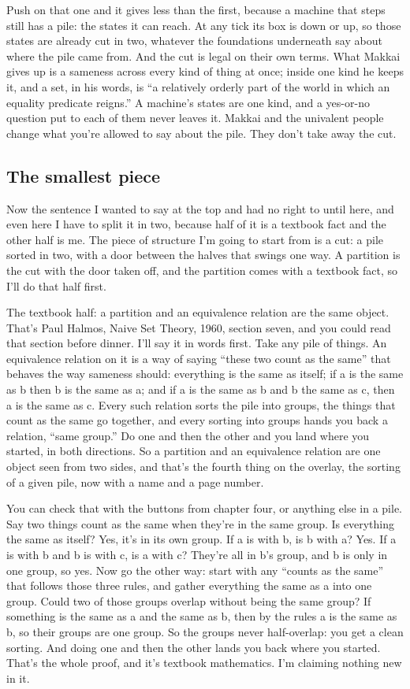 \documentclass[11pt,twoside]{article}
\theoremstyle{thielethm}
\theoremstyle{thieledef}
\theoremstyle{thieledef}
\theoremstyle{thieledef}
\theoremstyle{thielethm}
\theoremstyle{thieleobs}
\theoremstyle{thielethm}
\begin{document}
Push on that one and it gives less than the first, because a machine that steps still has a pile: the states it can reach. At any tick its box is down or up, so those states are already cut in two, whatever the foundations underneath say about where the pile came from. And the cut is legal on their own terms. What Makkai gives up is a sameness across every kind of thing at once; inside one kind he keeps it, and a set, in his words, is ``a relatively orderly part of the world in which an equality predicate reigns.'' A machine's states are one kind, and a yes-or-no question put to each of them never leaves it. Makkai and the univalent people change what you're allowed to say about the pile. They don't take away the cut.

\subsection{The smallest piece}

Now the sentence I wanted to say at the top and had no right to until here, and even here I have to split it in two, because half of it is a textbook fact and the other half is me. The piece of structure I'm going to start from is a cut: a pile sorted in two, with a door between the halves that swings one way. A partition is the cut with the door taken off, and the partition comes with a textbook fact, so I'll do that half first.

The textbook half: a partition and an equivalence relation are the same object. That's Paul Halmos, Naive Set Theory, 1960, section seven, and you could read that section before dinner. I'll say it in words first. Take any pile of things. An equivalence relation on it is a way of saying ``these two count as the same'' that behaves the way sameness should: everything is the same as itself; if a is the same as b then b is the same as a; and if a is the same as b and b the same as c, then a is the same as c. Every such relation sorts the pile into groups, the things that count as the same go together, and every sorting into groups hands you back a relation, ``same group.'' Do one and then the other and you land where you started, in both directions. So a partition and an equivalence relation are one object seen from two sides, and that's the fourth thing on the overlay, the sorting of a given pile, now with a name and a page number.

You can check that with the buttons from chapter four, or anything else in a pile. Say two things count as the same when they're in the same group. Is everything the same as itself? Yes, it's in its own group. If a is with b, is b with a? Yes. If a is with b and b is with c, is a with c? They're all in b's group, and b is only in one group, so yes. Now go the other way: start with any ``counts as the same'' that follows those three rules, and gather everything the same as a into one group. Could two of those groups overlap without being the same group? If something is the same as a and the same as b, then by the rules a is the same as b, so their groups are one group. So the groups never half-overlap: you get a clean sorting. And doing one and then the other lands you back where you started. That's the whole proof, and it's textbook mathematics. I'm claiming nothing new in it.
\end{document}
